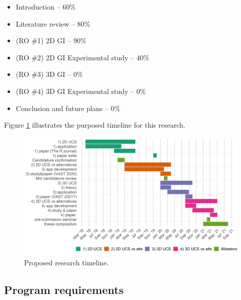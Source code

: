\documentclass[
  11,
]{article}
\providecommand{\tightlist}{%
  \setlength{\itemsep}{0pt}\setlength{\parskip}{0pt}}
\begin{document}
\begin{itemize}
\tightlist
\item
  Introduction -- 60\%
\item
  Literature review -- 80\%
\item
  (RO \#1) 2D GI -- 90\%
\item
  (RO \#2) 2D GI Experimental study -- 40\%
\item
  (RO \#3) 3D GI -- 0\%
\item
  (RO \#4) 3D GI Experimental study -- 0\%
\item
  Conclusion and future plans -- 0\%
\end{itemize}

Figure \ref{fig:timeline} illustrates the purposed timeline for this research.

\begin{figure}[h]

{\centering \includegraphics[width=1\linewidth,]{figures/phd_timeline} 

}

\caption{Proposed research timeline.}\label{fig:timeline}
\end{figure}

\hypertarget{program-requirements}{%
\subsection{Program requirements}\label{program-requirements}}
\end{document}
